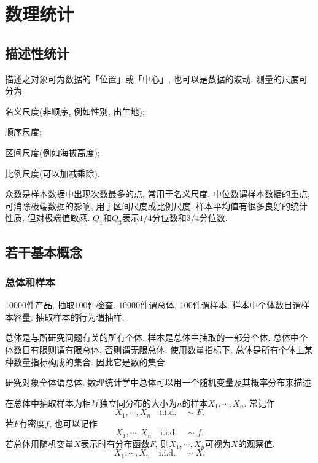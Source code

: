 \documentclass{ctexart}
\begin{document}
\section{数理统计} %
\label{sec:数理统计}

\subsection{描述性统计} %
\label{sub:描述性统计}

描述之对象可为数据的「位置」或「中心」, 也可以是数据的波动. 测量的尺度可分为
\begin{cenum}
    \item 名义尺度(非顺序, 例如性别, 出生地);
    \item 顺序尺度;
    \item 区间尺度(例如海拔高度);
    \item 比例尺度(可以加减乘除).
\end{cenum}
众数是样本数据中出现次数最多的点, 常用于名义尺度. 中位数谓样本数据的重点, 可消除极端数据的影响, 用于区间尺度或比例尺度. 样本平均值有很多良好的统计性质, 但对极端值敏感. $Q_1$和$Q_3$表示$1/4$分位数和$3/4$分位数.


\subsection{若干基本概念} %
\label{sub:若干基本概念}

\subsubsection{总体和样本} %
\label{ssub:总体和样本}

\begin{sample}
    \begin{ex}
        $10000$件产品, 抽取$100$件检查. $10000$件谓总体, $100$件谓样本. 样本中个体数目谓样本容量. 抽取样本的行为谓抽样.
    \end{ex}
\end{sample}
总体是与所研究问题有关的所有个体. 样本是总体中抽取的一部分个体. 总体中个体数目有限则谓有限总体, 否则谓无限总体. 使用数量指标下, 总体是所有个体上某种数量指标构成的集合. 因此它是数的集合.
\begin{definition}
    研究对象全体谓总体. 数理统计学中总体可以用一个随机变量及其概率分布来描述.
\end{definition}
在总体中抽取样本为相互独立同分布的大小为$n$的样本$X_1, \cdots, X_n$. 常记作
\[ X_1,\cdots,X_n\quad \mathrm{i.i.d.} \quad \sim F. \]
若$F$有密度$f$, 也可以记作
\[ X_1,\cdots,X_n\quad \mathrm{i.i.d.} \quad \sim f. \]
若总体用随机变量$X$表示时有分布函数$F$, 则$X_1, \cdots, X_n$可视为$X$的观察值.
\[ X_1,\cdots,X_n\quad \mathrm{i.i.d.} \quad \sim X. \]
\end{document}
